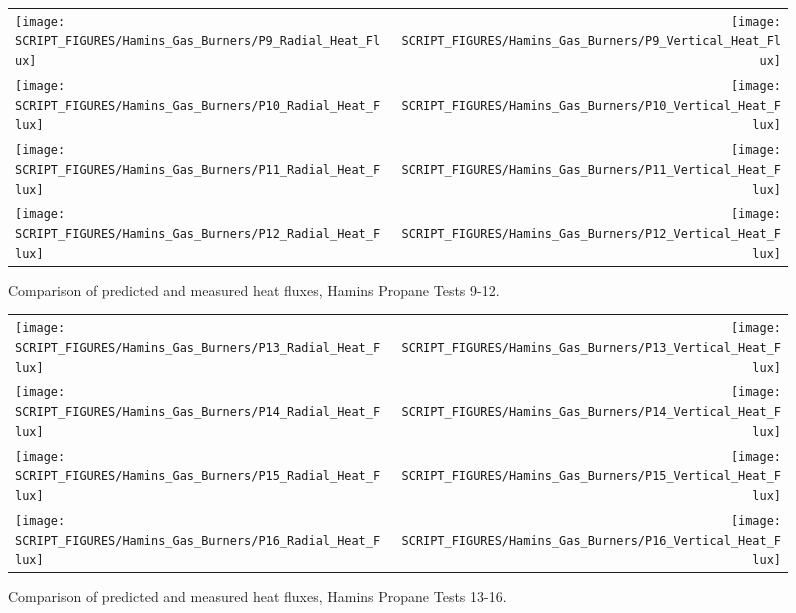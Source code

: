 \begin{figure}[p]
\begin{tabular*}{\textwidth}{l@{\extracolsep{\fill}}r}
\texttt{[image: SCRIPT\_FIGURES/Hamins\_Gas\_Burners/P9\_Radial\_Heat\_Flux]} &
\texttt{[image: SCRIPT\_FIGURES/Hamins\_Gas\_Burners/P9\_Vertical\_Heat\_Flux]} \\
\texttt{[image: SCRIPT\_FIGURES/Hamins\_Gas\_Burners/P10\_Radial\_Heat\_Flux]} &
\texttt{[image: SCRIPT\_FIGURES/Hamins\_Gas\_Burners/P10\_Vertical\_Heat\_Flux]} \\
\texttt{[image: SCRIPT\_FIGURES/Hamins\_Gas\_Burners/P11\_Radial\_Heat\_Flux]} &
\texttt{[image: SCRIPT\_FIGURES/Hamins\_Gas\_Burners/P11\_Vertical\_Heat\_Flux]} \\
\texttt{[image: SCRIPT\_FIGURES/Hamins\_Gas\_Burners/P12\_Radial\_Heat\_Flux]} &
\texttt{[image: SCRIPT\_FIGURES/Hamins\_Gas\_Burners/P12\_Vertical\_Heat\_Flux]}
\end{tabular*}
\label{Hamins_Propane_9-12}
\caption[Heat flux predictions, Hamins propane burner Tests 9-12]
{Comparison of predicted and measured heat fluxes, Hamins Propane Tests 9-12.}
\end{figure}

\begin{figure}[p]
\begin{tabular*}{\textwidth}{l@{\extracolsep{\fill}}r}
\texttt{[image: SCRIPT\_FIGURES/Hamins\_Gas\_Burners/P13\_Radial\_Heat\_Flux]} &
\texttt{[image: SCRIPT\_FIGURES/Hamins\_Gas\_Burners/P13\_Vertical\_Heat\_Flux]} \\
\texttt{[image: SCRIPT\_FIGURES/Hamins\_Gas\_Burners/P14\_Radial\_Heat\_Flux]} &
\texttt{[image: SCRIPT\_FIGURES/Hamins\_Gas\_Burners/P14\_Vertical\_Heat\_Flux]} \\
\texttt{[image: SCRIPT\_FIGURES/Hamins\_Gas\_Burners/P15\_Radial\_Heat\_Flux]} &
\texttt{[image: SCRIPT\_FIGURES/Hamins\_Gas\_Burners/P15\_Vertical\_Heat\_Flux]} \\
\texttt{[image: SCRIPT\_FIGURES/Hamins\_Gas\_Burners/P16\_Radial\_Heat\_Flux]} &
\texttt{[image: SCRIPT\_FIGURES/Hamins\_Gas\_Burners/P16\_Vertical\_Heat\_Flux]}
\end{tabular*}
\label{Hamins_Propane_13-16}
\caption[Heat flux predictions, Hamins propane burner Tests 13-16]
{Comparison of predicted and measured heat fluxes, Hamins Propane Tests 13-16.}
\end{figure}

